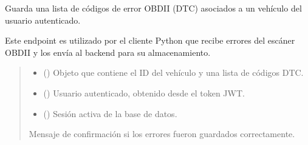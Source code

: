 \documentclass[letterpaper,10pt,spanish]{sphinxmanual}
\begin{document}
\begin{fulllineitems}
\label{\detokenize{endpoints:main.guardar_errores}}
\pysigstartsignatures
\pysiglinewithargsret
{}
{\sphinxparamcomma {}\sphinxparamcomma {}}
{}
\pysigstopsignatures
\sphinxAtStartPar
Guarda una lista de códigos de error OBD\sphinxhyphen{}II (DTC) asociados a un vehículo del usuario autenticado.

\sphinxAtStartPar
Este endpoint es utilizado por el cliente Python que recibe errores del escáner OBD\sphinxhyphen{}II y los envía al backend para su almacenamiento.
\begin{quote}\begin{description}
\begin{itemize}
\item {} 
\sphinxAtStartPar
{} ({\hyperref[\detokenize{modelos:main.ErrorVehiculoRegistro}]{}}) \textendash{} Objeto que contiene el ID del vehículo y una lista de códigos DTC.

\item {} 
\sphinxAtStartPar
{} ({\hyperref[\detokenize{modelos:main.Usuario}]{}}) \textendash{} Usuario autenticado, obtenido desde el token JWT.

\item {} 
\sphinxAtStartPar
{} () \textendash{} Sesión activa de la base de datos.

\end{itemize}

\sphinxAtStartPar
Mensaje de confirmación si los errores fueron guardados correctamente.


\end{description}
\end{quote}
\end{fulllineitems}
\end{document}
